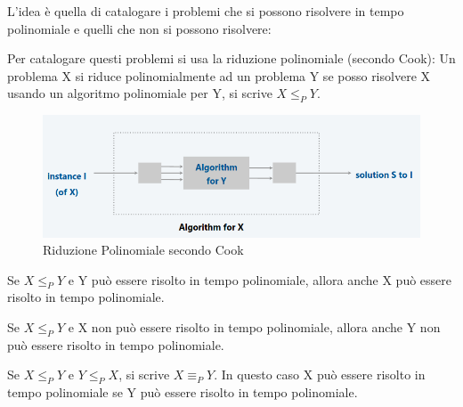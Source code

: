 \documentclass{article}
\begin{document}
\noindent L'idea è quella di catalogare i problemi che si possono risolvere in tempo polinomiale e quelli che non si possono risolvere: 

\noindent Per catalogare questi problemi si usa la riduzione polinomiale (secondo Cook): 
Un problema X si riduce polinomialmente ad un problema Y se posso risolvere X usando un algoritmo polinomiale per Y, si scrive $X \leq_P Y$.
\begin{figure}[H]
    \centering
    \includegraphics[width=0.5\linewidth]{Screenshot from 2024-05-30 08-27-27.png}
    \caption{Riduzione Polinomiale secondo Cook}
    \label{fig:enter-label}
\end{figure}
\noindent Se $X \leq_P Y$ e Y può essere risolto in tempo polinomiale, allora anche X può essere risolto in tempo polinomiale. 

\noindent Se $X \leq_P Y$ e X non può essere risolto in tempo polinomiale, allora anche Y non può essere risolto in tempo polinomiale. 

\noindent Se $X \leq_P Y$ e $Y \leq_P X$, si scrive $X \equiv_P Y$. In questo caso X può essere risolto in tempo polinomiale se Y può essere risolto in tempo polinomiale.
\newpage
\end{document}
